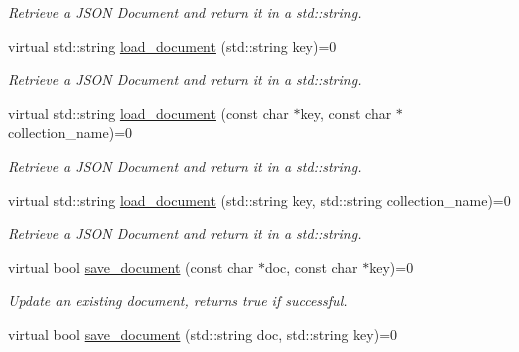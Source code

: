 \begin{DoxyCompactItemize}
\begin{DoxyCompactList}\small\item\em Retrieve a J\-S\-O\-N Document and return it in a std\-::string. \end{DoxyCompactList}\item 
\hypertarget{classMongoInterface_a9a7d1032d4b5b742c38c0102ebabb1b2}{virtual std\-::string \hyperlink{classMongoInterface_a9a7d1032d4b5b742c38c0102ebabb1b2}{load\-\_\-document} (std\-::string key)=0}\label{classMongoInterface_a9a7d1032d4b5b742c38c0102ebabb1b2}

\begin{DoxyCompactList}\small\item\em Retrieve a J\-S\-O\-N Document and return it in a std\-::string. \end{DoxyCompactList}\item 
\hypertarget{classMongoInterface_ac99e872d169bd1ef67ead713d748c422}{virtual std\-::string \hyperlink{classMongoInterface_ac99e872d169bd1ef67ead713d748c422}{load\-\_\-document} (const char $\ast$key, const char $\ast$collection\-\_\-name)=0}\label{classMongoInterface_ac99e872d169bd1ef67ead713d748c422}

\begin{DoxyCompactList}\small\item\em Retrieve a J\-S\-O\-N Document and return it in a std\-::string. \end{DoxyCompactList}\item 
\hypertarget{classMongoInterface_a0f7cb82056034bcf97175e718a6a8846}{virtual std\-::string \hyperlink{classMongoInterface_a0f7cb82056034bcf97175e718a6a8846}{load\-\_\-document} (std\-::string key, std\-::string collection\-\_\-name)=0}\label{classMongoInterface_a0f7cb82056034bcf97175e718a6a8846}

\begin{DoxyCompactList}\small\item\em Retrieve a J\-S\-O\-N Document and return it in a std\-::string. \end{DoxyCompactList}\item 
\hypertarget{classMongoInterface_af706938f10d48e292ea1a456e547dec6}{virtual bool \hyperlink{classMongoInterface_af706938f10d48e292ea1a456e547dec6}{save\-\_\-document} (const char $\ast$doc, const char $\ast$key)=0}\label{classMongoInterface_af706938f10d48e292ea1a456e547dec6}

\begin{DoxyCompactList}\small\item\em Update an existing document, returns true if successful. \end{DoxyCompactList}\item 
\hypertarget{classMongoInterface_a85a9f54cde548bef8ac4820192901c2c}{virtual bool \hyperlink{classMongoInterface_a85a9f54cde548bef8ac4820192901c2c}{save\-\_\-document} (std\-::string doc, std\-::string key)=0}\label{classMongoInterface_a85a9f54cde548bef8ac4820192901c2c}


\end{DoxyCompactItemize}
